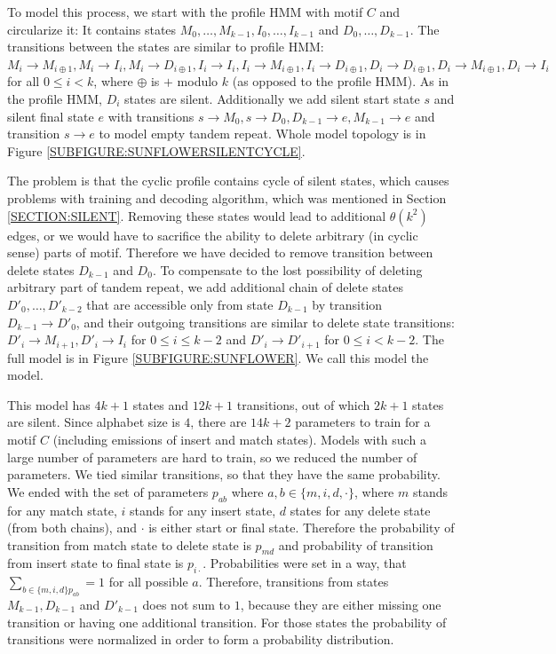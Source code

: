 To model this process, we start with the profile HMM with motif $C$ and
circularize it: It contains states $M_0,\dots, M_{k-1}, I_{0}, \dots, I_{k-1}$
and $D_{0}, \dots, D_{k-1}$. The transitions between the states are similar to
profile HMM:  $M_{i}\to M_{i\oplus 1}, M_i\to I_i, M_i\to D_{i\oplus 1}, I_i\to
I_i, I_i\to M_{i\oplus 1}, I_i\to D_{i\oplus 1}, D_{i}\to D_{i \oplus 1},
D_{i}\to M_{i\oplus 1}, D_{i}\to I_i$ for all $0\leq i < k$, where $\oplus$ is
$+$ modulo $k$ (as opposed to the profile HMM). As in the profile HMM, $D_i$ states
are silent. Additionally we add silent start state $s$ and silent final state
$e$ with transitions $s\to M_0, s\to D_0, D_{k-1}\to e, M_{k-1}\to e$ and
transition $s\to e$ to model empty tandem repeat.  Whole model topology is in
Figure \ref{SUBFIGURE:SUNFLOWERSILENTCYCLE}.

The problem is that the cyclic profile contains cycle of silent states, which
causes problems with training and decoding algorithm, which was mentioned in
Section \ref{SECTION:SILENT}. Removing these states would lead to additional
$\theta(k^2)$ edges, or we would have to sacrifice the ability to delete arbitrary
(in cyclic sense) parts of motif. Therefore we have decided to remove
transition between delete states $D_{k-1}$ and $D_0$. To compensate to the lost
possibility of deleting arbitrary part of tandem repeat, we add additional
chain of delete states $D'_0, \dots, D'_{k-2}$ that are accessible only from
state $D_{k-1}$ by transition $D_{k-1}\to D'_0$, and their outgoing transitions
are similar to delete state transitions: $D'_{i}\to M_{i+1}, D'_{i}\to I_i$ for
$0\leq i\leq k-2$ and $D'_{i} \to D'_{i+1}$ for $0\leq i < k-2$. The full model
is in Figure \ref{SUBFIGURE:SUNFLOWER}. We call this model the
 model.

This model has $4k+1$ states and $12k+1$ transitions, out of which $2k+1$
states are silent.  Since alphabet size is $4$, there are $14k+2$ parameters to
train for a motif $C$ (including emissions of insert and match states). Models
with such a large number of parameters are hard to train, so we reduced the
number of parameters. We tied similar transitions, so that they have the same
probability.  We ended with the set of parameters $p_{ab}$ where $a,b\in \{m,
i, d, \cdot\}$, where $m$ stands for any match state, $i$ stands for any insert
state, $d$ states for any delete state (from both chains), and $\cdot$ is
either start or final state. Therefore the probability of transition from match
state to delete state is $p_{md}$ and probability of transition from insert
state to final state is $p_{i\cdot}$.  Probabilities were set in a way, that
$\sum_{b\in\{m,i,d\} p_{ab}}=1$ for all possible $a$.  Therefore, transitions
from states $M_{k-1}, D_{k-1}$ and $D'_{k-1}$ does not sum to $1$, because they
are either missing one transition or having one additional transition. For
those states the probability of transitions were normalized in order to form a
probability distribution. 

